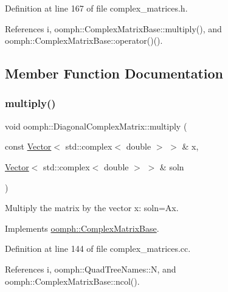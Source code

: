 Definition at line 167 of file complex\+\_\+matrices.\+h.



References i, oomph\+::\+Complex\+Matrix\+Base\+::multiply(), and oomph\+::\+Complex\+Matrix\+Base\+::operator()().



\subsection{Member Function Documentation}
\mbox{\label{classoomph_1_1DiagonalComplexMatrix_a8e7b0ca4ea51eb40fa9fe4fd8e9ba99c}} 
\subsubsection{\texorpdfstring{multiply()}{multiply()}}
{\footnotesize\ttfamily void oomph\+::\+Diagonal\+Complex\+Matrix\+::multiply (\begin{DoxyParamCaption}\item[{const \hyperlink{classoomph_1_1Vector}{Vector}$<$ std\+::complex$<$ double $>$ $>$ \&}]{x,  }\item[{\hyperlink{classoomph_1_1Vector}{Vector}$<$ std\+::complex$<$ double $>$ $>$ \&}]{soln }\end{DoxyParamCaption})\hspace{0.3cm}{\ttfamily [virtual]}}



Multiply the matrix by the vector x\+: soln=Ax. 



Implements \hyperlink{classoomph_1_1ComplexMatrixBase_a730c106643464a29ebf0660a6921ebaa}{oomph\+::\+Complex\+Matrix\+Base}.



Definition at line 144 of file complex\+\_\+matrices.\+cc.



References i, oomph\+::\+Quad\+Tree\+Names\+::N, and oomph\+::\+Complex\+Matrix\+Base\+::ncol().

\mbox{\label{classoomph_1_1DiagonalComplexMatrix_a1de87dc3b52ecb737d15893860c5844b}} 
